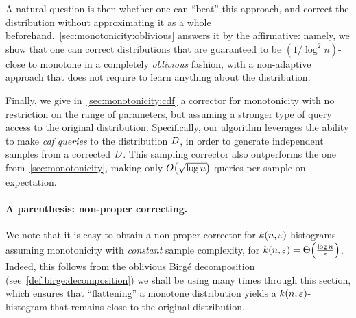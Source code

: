 A natural question is then whether one can ``beat'' this approach, and correct the distribution without approximating it as a whole beforehand.~\cref{sec:monotonicity:oblivious} answers it by the affirmative: namely, we show that one can correct distributions that are guaranteed to be $(1/\log^2 n)$-close to monotone in a completely \emph{oblivious} fashion, with a non-adaptive approach that does not require to learn anything about the distribution.

Finally, we give in~\cref{sec:monotonicity:cdf} a corrector for monotonicity with no restriction on the range of parameters, but assuming a stronger type of query access to the original distribution. {Specifically}, our algorithm leverages the ability to make \emph{cdf queries} to the distribution $D$, in order to generate independent samples from a corrected $\tilde{D}$. This sampling corrector also outperforms the one from~\cref{sec:monotonicity}, making only $\bigO{\sqrt{\log n}}$ queries per sample on expectation.

{\paragraph{A parenthesis: non-proper correcting.} We note that it is easy to obtain a non-proper corrector for $k(n,\varepsilon)$-histograms assuming monotonicity with \emph{constant} sample complexity, for $k(n,\eps) = \bigTheta{\frac{\log n}{\eps}}$. Indeed, this follows from the oblivious Birg\'e decomposition {(see~\cref{def:birge:decomposition})} we shall be using many times through this section, which ensures that ``flattening'' a monotone distribution yields a $k(n,\varepsilon)$-histogram that remains close to the original distribution.}

